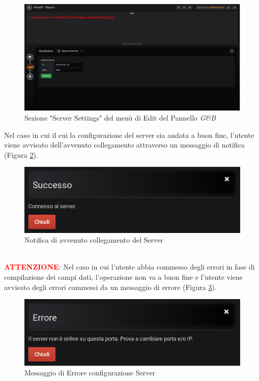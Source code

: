 \begin{figure}[H]
	\begin{center}
		\includegraphics[scale=0.37]{./images/ServerSettings.png}
		 \caption{Sezione "Server Settings" del menù di Edit del Pannello \textit{G\&B}}	
		 \label{ServerSettings}
	\end{center}
\end{figure}

Nel caso in cui il cui la configurazione del server sia andata a buon fine, l'utente viene avvisato dell'avvenuto collegamento attraverso un messaggio di notifica (Figura \ref{NotificaServer}).

\begin{figure}[H]
	\begin{center}
		\includegraphics[scale=0.6]{./images/NotificaServer.png}
		 \caption{Notifica di avvenuto collegamento del Server}	
		 \label{NotificaServer}
	\end{center}
\end{figure}

~\\
\textbf{\textcolor{red}{ATTENZIONE}}: Nel caso in cui l'utente abbia commesso degli errori in fase di compilazione dei campi dati, l'operazione non va a buon fine e l'utente viene avvisato degli errori commessi da un messaggio di errore (Figura \ref{ErroreServer}).

\begin{figure}[H]
	\begin{center}
		\includegraphics[scale=0.6]{./images/ErroreServer.png}
		 \caption{Messaggio di Errore configurazione Server}	
		 \label{ErroreServer}
	\end{center}
\end{figure}


